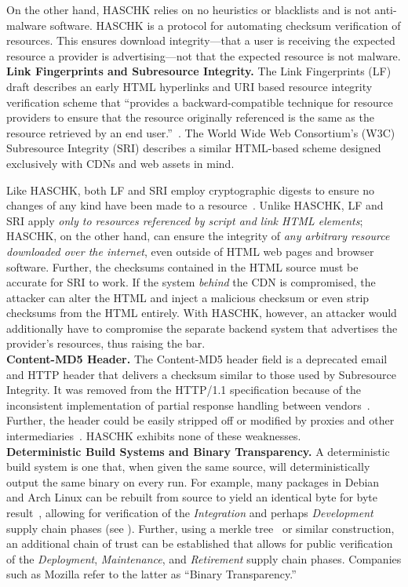 On the other hand, HASCHK relies on no heuristics or blacklists and is not
anti-malware software. HASCHK is a protocol for automating checksum
verification of resources. This ensures download integrity---that a user is
receiving the expected resource a provider is advertising---not that the
expected resource is not malware. \\

\noindent\textbf{Link Fingerprints and Subresource Integrity.} The Link
Fingerprints (LF) draft describes an early HTML hyperlinks and URI based
resource integrity verification scheme that ``provides a backward-compatible
technique for resource providers to ensure that the resource originally
referenced is the same as the resource retrieved by an end user.''~\cite{LF}.
The World Wide Web Consortium's (W3C) Subresource Integrity (SRI) describes a
similar HTML-based scheme designed exclusively with CDNs and web assets in mind.

Like HASCHK, both LF and SRI employ cryptographic digests to ensure no
changes of any kind have been made to a resource~\cite{SRI}. Unlike HASCHK,
LF and SRI apply \emph{only to resources referenced by script and link HTML
elements}; HASCHK, on the other hand, can ensure the integrity of \emph{any
arbitrary resource downloaded over the internet}, even outside of HTML web pages
and browser software. Further, the checksums contained in the HTML source must
be accurate for SRI to work. If the system \emph{behind} the CDN is compromised,
the attacker can alter the HTML and inject a malicious checksum or even strip
checksums from the HTML entirely. With HASCHK, however, an attacker would
additionally have to compromise the separate backend system that advertises the
provider's resources, thus raising the bar. \\

\noindent\textbf{Content-MD5 Header.} The Content-MD5 header field is a
deprecated email and HTTP header that delivers a checksum similar to those used
by Subresource Integrity. It was removed from the HTTP/1.1 specification because
of the inconsistent implementation of partial response handling between
vendors~\cite{HTTP1.1}. Further, the header could be easily stripped off or
modified by proxies and other intermediaries~\cite{MD5Header}. HASCHK
exhibits none of these weaknesses. \\

\noindent\textbf{Deterministic Build Systems and Binary Transparency.} A
deterministic build system is one that, when given the same source, will
deterministically output the same binary on every run. For example, many
packages in Debian~\cite{ReproBuildsDebian} and Arch Linux can be rebuilt from
source to yield an identical byte for byte result~\cite{ReproBuilds}, allowing
for verification of the \emph{Integration} and perhaps \emph{Development} supply
chain phases (see ). Further, using a merkle
tree~\cite{MerkleTree} or similar construction, an additional chain of trust can
be established that allows for public verification of the \emph{Deployment},
\emph{Maintenance}, and \emph{Retirement} supply chain phases. Companies such as
Mozilla refer to the latter as ``Binary Transparency.''


